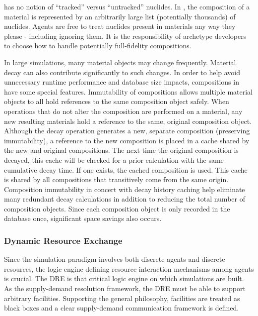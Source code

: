 \Cyclus has no notion of ``tracked'' versus ``untracked'' nuclides.  In \Cyclus, the composition of a material
is represented by an arbitrarily large list (potentially thousands) of
nuclides.  Agents are free to treat nuclides present in materials any way they
please - including ignoring them.  It is the responsibility of archetype
developers to choose how to handle potentially full-fidelity compositions.

In large simulations, many material objects may change frequently.
Material decay can also contribute significantly to such changes.  In order to
help avoid unnecessary runtime performance and database size impacts,
compositions in \Cyclus have some special features.
Immutability of compositions allows multiple material objects to all hold
references to the same composition object safely.  When operations that do not
alter the composition are performed on a material, any new resulting
materials hold a reference to the same, original composition object.
Although the decay operation generates a new, separate composition (preserving
immutability), a reference to the new composition is placed in a cache shared
by the new and original compositions. The next time the original
composition is decayed, this cache will be checked for a prior calculation
with the same cumulative decay time.  If one exists, the cached composition is
used.  This cache is shared by all compositions that transitively come from
the same origin.  Composition immutability in concert with decay history
caching help eliminate many redundant decay calculations in addition to
reducing the total number of composition objects.  Since each composition
object is only recorded in the database once, significant space savings also
occurs.

\subsubsection{Dynamic Resource Exchange}

Since the \Cyclus simulation paradigm involves both discrete agents and
discrete resources, the logic engine defining resource interaction mechanisms
among agents is crucial. The \gls{DRE} is that critical logic engine on which \Cyclus
simulations are built.
As the \Cyclus supply-demand resolution framework,
the DRE must be able to support arbitrary facilities. Supporting the general
\Cyclus philosophy, facilities are treated as black boxes and a clear
supply-demand communication framework is defined.

